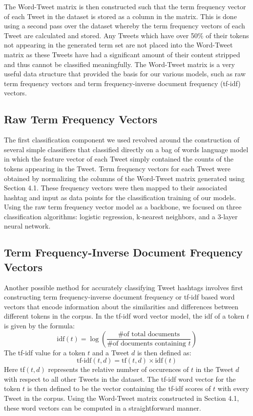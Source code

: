 \documentclass[11pt]{article}
\begin{document}
The Word-Tweet matrix is then constructed such that the term frequency vector of each Tweet in the dataset is stored as a column in the matrix. This is done using a second pass over the dataset whereby the term frequency vectors of each Tweet are calculated and stored. Any Tweets which have over 50\% of their tokens not appearing in the generated term set are not placed into the Word-Tweet matrix as these Tweets have had a significant amount of their content stripped and thus cannot be classified meaningfully. The Word-Tweet matrix is a very useful data structure that provided the basis for our various models, such as raw term frequency vectors and term frequency-inverse document frequency (tf-idf) vectors.

\subsection{Raw Term Frequency Vectors}

The first classification component we used revolved around the construction of several simple classifiers that classified directly on a bag of words language model in which the feature vector of each Tweet simply contained the counts of the tokens appearing in the Tweet. Term frequency vectors for each Tweet were obtained by normalizing the columns of the Word-Tweet matrix generated using Section 4.1. These frequency vectors were then mapped to their associated hashtag and input as data points for the classification training of our models. Using the raw term frequency vector model as a backbone, we focused on three classification algorithms: logistic regression, k-nearest neighbors, and a 3-layer neural network.

\subsection{Term Frequency-Inverse Document Frequency Vectors}

Another possible method for accurately classifying Tweet hashtags involves first constructing term frequency-inverse document frequency or tf-idf based word vectors that encode information about the similarities and differences between different tokens in the corpus. In the tf-idf word vector model, the idf of a token $t$ is given by the formula:
\[
\text{idf}(t) = \log \left( \frac{ \text{\# of total documents}}{ \text{\# of documents containing }t } \right)
\]
The tf-idf value for a token $t$ and a Tweet $d$ is then defined as:
\[
\text{tf-idf}(t, d) = \text{tf}(t, d) \times \text{idf}(t)
\]
Here tf$(t,d)$ represents the relative number of occurences of $t$ in the Tweet $d$ with respect to all other Tweets in the dataset. The tf-idf word vector for the token $t$ is then defined to be the vector containing the tf-idf scores of $t$ with every Tweet in the corpus. Using the Word-Tweet matrix constructed in Section 4.1, these word vectors can be computed in a straightforward manner.
\end{document}
